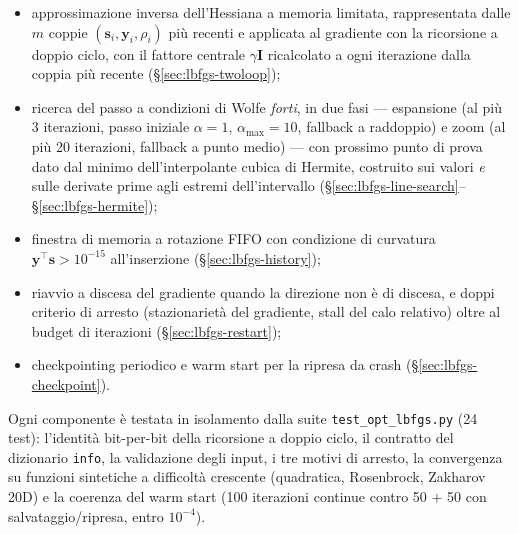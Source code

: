 \begin{itemize}
\item approssimazione inversa dell'Hessiana a memoria limitata,
  rappresentata dalle $m$ coppie $(\bm{s}_i,\bm{y}_i,\rho_i)$ più
  recenti e applicata al gradiente con la ricorsione a doppio ciclo, con
  il fattore centrale $\gamma\bm{I}$ ricalcolato a ogni iterazione dalla
  coppia più recente (\/\S\ref{sec:lbfgs-twoloop});
\item ricerca del passo a condizioni di Wolfe \emph{forti}, in due fasi —
  espansione (al più 3 iterazioni, passo iniziale $\alpha = 1$,
  $\alpha_{\max} = 10$, fallback a raddoppio) e zoom (al più 20
  iterazioni, fallback a punto medio) — con prossimo punto di prova
  dato dal minimo dell'interpolante cubica di Hermite, costruito sui
  valori \emph{e} sulle derivate prime agli estremi dell'intervallo
  (\/\S\ref{sec:lbfgs-line-search}--\S\ref{sec:lbfgs-hermite});
\item finestra di memoria a rotazione FIFO con condizione di curvatura
  $\bm{y}^{\!\top}\bm{s} > 10^{-15}$ all'inserzione
  (\/\S\ref{sec:lbfgs-history});
\item riavvio a discesa del gradiente quando la direzione non è di
  discesa, e doppi criterio di arresto (stazionarietà del gradiente,
  stall del calo relativo) oltre al budget di iterazioni
  (\/\S\ref{sec:lbfgs-restart});
\item checkpointing periodico e warm start per la ripresa da crash
  (\/\S\ref{sec:lbfgs-checkpoint}).
\end{itemize}

Ogni componente è testata in isolamento dalla suite
\texttt{test\_opt\_lbfgs.py} (24 test): l'identità bit-per-bit della
ricorsione a doppio ciclo, il contratto del dizionario \texttt{info},
la validazione degli input, i tre motivi di arresto, la convergenza su
funzioni sintetiche a difficoltà crescente (quadratica, Rosenbrock,
Zakharov 20D) e la coerenza del warm start (100 iterazioni continue
contro 50 $+$ 50 con salvataggio/ripresa, entro $10^{-4}$).
